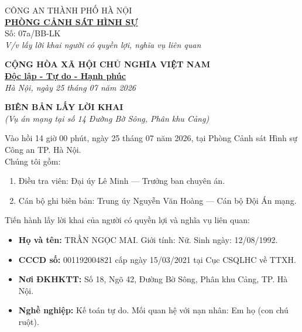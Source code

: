 \documentclass[12pt,a4paper]{article}
\begin{document}
\noindent
\begin{minipage}[t]{0.45\textwidth}
    \begin{center}
        \small
        CÔNG AN THÀNH PHỐ HÀ NỘI\\
        \textbf{\underline{PHÒNG CẢNH SÁT HÌNH SỰ}}\\[0.1cm]
        Số: 07a/BB-LK\\
        \textit{V/v lấy lời khai người có quyền lợi, nghĩa vụ liên quan}
    \end{center}
\end{minipage}
\hfill
\begin{minipage}[t]{0.52\textwidth}
    \begin{center}
        \small
        \textbf{CỘNG HÒA XÃ HỘI CHỦ NGHĨA VIỆT NAM}\\
        \textbf{\underline{Độc lập - Tự do - Hạnh phúc}}\\[0.1cm]
        \textit{Hà Nội, ngày 25 tháng 07 năm 2026}
    \end{center}
\end{minipage}

\vspace{0.6cm}

\begin{center}
    \textbf{\large BIÊN BẢN LẤY LỜI KHAI}\\
    \textit{(Vụ án mạng tại số 14 Đường Bờ Sông, Phân khu Cảng)}
\end{center}

\vspace{0.3cm}

\noindent Vào hồi 14 giờ 00 phút, ngày 25 tháng 07 năm 2026, tại Phòng Cảnh sát Hình sự Công an TP. Hà Nội.\\
Chúng tôi gồm:
\begin{enumerate}[label=\arabic*., leftmargin=1.5cm]
    \item Điều tra viên: Đại úy Lê Minh — Trưởng ban chuyên án.
    \item Cán bộ ghi biên bản: Trung úy Nguyễn Văn Hoàng — Cán bộ Đội Án mạng.
\end{enumerate}

\noindent Tiến hành lấy lời khai của người có quyền lợi và nghĩa vụ liên quan:
\begin{itemize}[leftmargin=1.5cm]
    \item \textbf{Họ và tên:} TRẦN NGỌC MAI. Giới tính: Nữ. Sinh ngày: 12/08/1992.
    \item \textbf{CCCD số:} 001192004821 cấp ngày 15/03/2021 tại Cục CSQLHC về TTXH.
    \item \textbf{Nơi ĐKHKTT:} Số 18, Ngõ 42, Đường Bờ Sông, Phân khu Cảng, TP. Hà Nội.
    \item \textbf{Nghề nghiệp:} Kế toán tự do. Mối quan hệ với nạn nhân: Em họ (con chú ruột).
\end{itemize}
\end{document}
